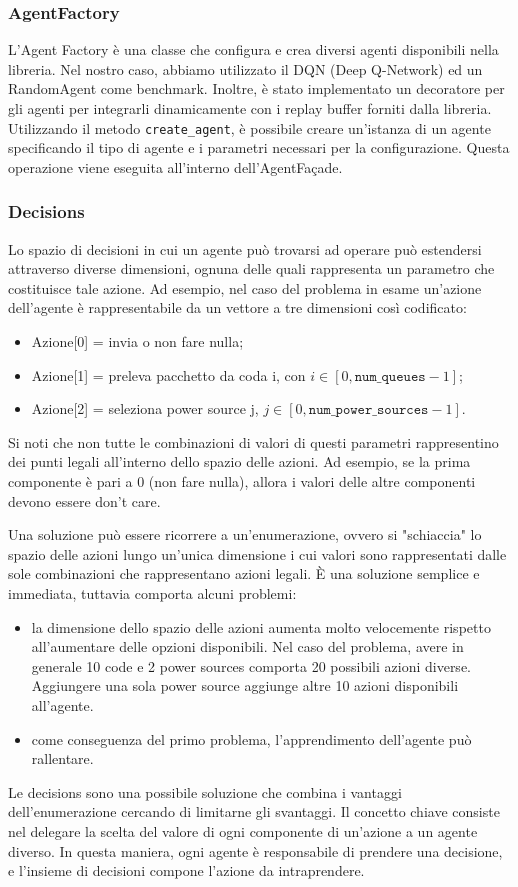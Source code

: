 \documentclass[conference]{IEEEtran}
\newcommand{\code}[1]{\texttt{#1}}
\begin{document}
\subsubsection{AgentFactory}
L'Agent Factory è una classe che configura e crea diversi agenti disponibili nella libreria. Nel nostro caso, abbiamo utilizzato il DQN (Deep Q-Network) ed un RandomAgent come benchmark. Inoltre, è stato implementato un decoratore per gli agenti per integrarli dinamicamente con i replay buffer forniti dalla libreria. Utilizzando il metodo \code{create\_agent}, è possibile creare un'istanza di un agente specificando il tipo di agente e i parametri necessari per la configurazione. Questa operazione viene eseguita all'interno dell'AgentFaçade.

\subsubsection{Decisions}
\label{subsec:Decisions}
Lo spazio di decisioni in cui un agente può trovarsi ad operare può estendersi
attraverso
diverse dimensioni, ognuna delle quali rappresenta un parametro che costituisce
tale azione. Ad esempio, nel caso del problema in esame un'azione dell'agente è
rappresentabile da un vettore a tre dimensioni così codificato:
\begin{itemize}
\item Azione[0] = invia o non fare nulla;
\item Azione[1] = preleva pacchetto da coda i, con $i \in [0, \code{num\_queues} - 1]$;
\item Azione[2] = seleziona power source j, $j \in [0, \code{num\_power\_sources} - 1]$.
\end{itemize}
Si noti che non tutte le combinazioni di valori di questi parametri
rappresentino dei punti legali all'interno dello spazio delle azioni.
Ad esempio, se la prima componente è pari a 0 (non fare nulla), allora i valori delle
altre componenti devono essere don't care.

Una soluzione può essere ricorrere a un'enumerazione, ovvero si "schiaccia"
lo spazio delle azioni lungo un'unica dimensione i cui valori sono rappresentati 
dalle sole combinazioni che rappresentano azioni legali. È una soluzione semplice e
immediata, tuttavia comporta alcuni problemi:
\begin{itemize}
    \item la dimensione dello spazio delle azioni aumenta molto velocemente rispetto
    all'aumentare delle opzioni disponibili. Nel caso del problema, avere in generale
    10 code e 2 power sources comporta 20 possibili azioni diverse. Aggiungere una
    sola power source aggiunge altre 10 azioni disponibili all'agente.
    \item come conseguenza del primo problema, l'apprendimento dell'agente può
    rallentare. %
\end{itemize}
Le decisions sono una possibile soluzione che combina i vantaggi dell'enumerazione
cercando di limitarne gli svantaggi. Il concetto chiave consiste nel delegare la scelta
del valore di ogni componente di un'azione a un agente diverso. In questa maniera,
ogni agente è responsabile di prendere una decisione, e l'insieme di decisioni compone
l'azione da intraprendere. 
\end{document}
